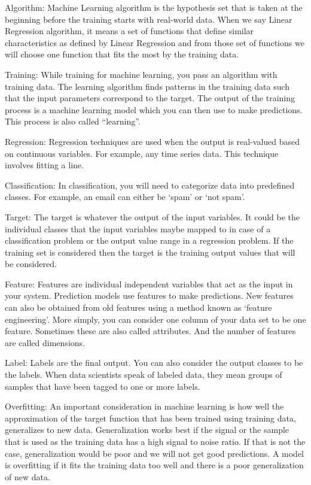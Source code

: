 \documentclass[11pt]{article}
\begin{document}
Algorithm: Machine Learning algorithm is the hypothesis set that is
taken at the beginning before the training starts with real-world
data. When we say Linear Regression algorithm, it means a set of
functions that define similar characteristics as defined by Linear
Regression and from those set of functions we will choose one function
that fits the most by the training data.

Training: While training for machine learning, you pass an algorithm
with training data. The learning algorithm finds patterns in the
training data such that the input parameters correspond to the target.
The output of the training process is a machine learning model which
you can then use to make predictions. This process is also called
“learning”.

Regression: Regression techniques are used when the output is
real-valued based on continuous variables. For example, any time
series data. This technique involves fitting a line.

Classification: In classification, you will need to categorize data
into predefined classes. For example, an email can either be ‘spam’ or
‘not spam’.

Target: The target is whatever the output of the input variables. It
could be the individual classes that the input variables maybe mapped
to in case of a classification problem or the output value range in a
regression problem. If the training set is considered then the target
is the training output values that will be considered.

Feature: Features are individual independent variables that act as the
input in your system. Prediction models use features to make
predictions. New features can also be obtained from old features using
a method known as ‘feature engineering’. More simply, you can consider
one column of your data set to be one feature. Sometimes these are
also called attributes. And the number of features are called
dimensions.

Label: Labels are the final output. You can also consider the output
classes to be the labels. When data scientists speak of labeled data,
they mean groups of samples that have been tagged to one or more
labels.

Overfitting: An important consideration in machine learning is how
well the approximation of the target function that has been trained
using training data, generalizes to new data. Generalization works
best if the signal or the sample that is used as the training data has
a high signal to noise ratio. If that is not the case, generalization
would be poor and we will not get good predictions. A model is
overfitting if it fits the training data too well and there is a poor
generalization of new data.
\end{document}

